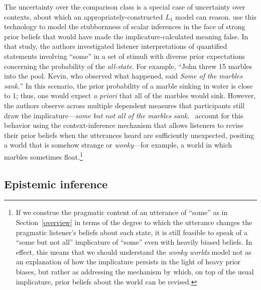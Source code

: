 \documentclass[10pt,letterpaper]{article}
\begin{document}
The uncertainty over the comparison class is a special case of uncertainty over contexts, about which an appropriately-constructed $L_1$ model can reason. \cite{degen2015wonky} use this technology to model the stubbornness of scalar inferences in the face of strong prior beliefs that would have made the implicature-calculated meaning false. In that study, the authors investigated listener interpretations of quantified statements involving ``some'' in a set of stimuli with diverse prior expectations concerning the probability of the \emph{all-state}. For example, ``John threw 15 marbles into the pool. Kevin, who observed what happened, said \emph{Some of the marbles sank.}'' In this scenario, the prior probability of a marble sinking in water is close to 1; thus, one would expect \emph{a priori} that all of the marbles would sink. However, the authors observe across multiple dependent measures that participants still draw the implicature---\emph{some but not all of the marbles sank}. \cite{degen2015wonky}~account for this behavior using the context-inference mechanism that allows listeners to revise their prior beliefs when the utterances heard are sufficiently unexpected, positing a world that is somehow strange or \emph{wonky}---for example, a world in which marbles sometimes float.\footnote{
 If we construe the pragmatic content of an utterance of ``some'' as in Section~\ref{overview} in terms of the degree to which the utterance changes the pragmatic listener's beliefs about each state, it is still feasible to speak of a ``some but not all'' implicature of ``some'' even with heavily biased beliefs. In effect, this means that we should understand the \emph{wonky worlds} model not as an explanation of how the implicature persists in the light of heavy prior biases, but rather as addressing the mechanism by which, on top of the usual implicature, prior beliefs about the world can be revised.
}


\subsection*{Epistemic inference}
\label{sec:epistemic-inference}
\end{document}
